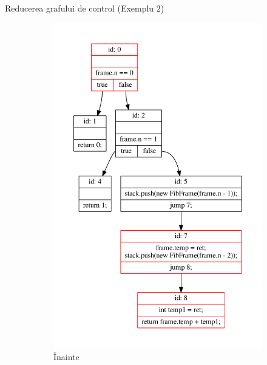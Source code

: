 \documentclass{beamer}
\begin{document}
\begin{frame}{Reducerea grafului de control (Exemplu 2)}
    \begin{figure}[htb]
        \begin{subfigure}[b]{.4\textwidth}
            \centering
            \includegraphics[width=\textwidth]{../../../theses/diploma/src/graph/inline-before.pdf}
            \caption{Înainte}
        \end{subfigure}
        \begin{subfigure}[b]{.4\textwidth}
            \centering

\end{subfigure}
\end{figure}
\end{frame}
\end{document}
